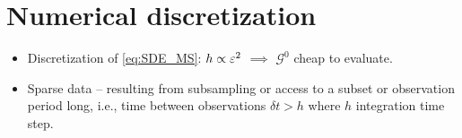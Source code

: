 \documentclass[10pt]{article}
\begin{document}

\section{Numerical discretization}

\begin{itemize}[label=-]
	\item Discretization of \eqref{eq:SDE_MS}: $h \propto \varepsilon^2$ $\implies$ $\mathcal G^0$ cheap to evaluate.
	\item Sparse data -- resulting from subsampling or access to a subset or observation period long, i.e., time between observations $\delta t > h$ where $h$ integration time step.
\end{itemize}
\end{document}
